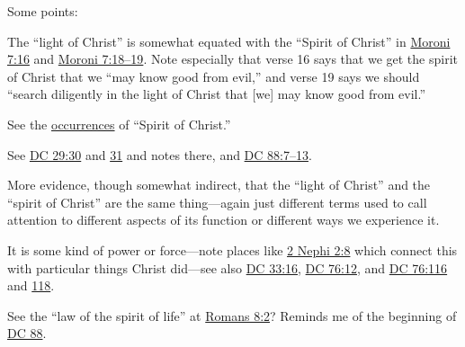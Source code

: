 		Some points:
		
			\begin{compactitem}
				\item The ``light of Christ'' is somewhat equated with the ``Spirit of Christ'' in \hyperref[MORONI-7-16]{Moroni 7:16} and \hyperref[MORONI-7-18]{Moroni 7:18--19}. Note especially that verse 16 says that we get the spirit of Christ that we ``may know good from evil,'' and verse 19 says we should ``search diligently in the light of Christ that [we] may know good from evil.''
					\begin{compactitem}
						\item See the \hyperref[SPIRIT-PHRASES]{occurrences} of ``Spirit of Christ.''
					\end{compactitem}
				\item See \hyperref[DC29-30]{DC 29:30} and \hyperref[DC29-31]{31} and notes there, and \hyperref[DC88-7]{DC 88:7--13}.
					\begin{compactitem}
						\item More evidence, though somewhat indirect, that the ``light of Christ'' and the ``spirit of Christ'' are the same thing---again just different terms used to call attention to different aspects of its function or different ways we experience it.
						\item It is some kind of power or force---note places like \hyperref[2NEPHI-2-8]{2 Nephi 2:8} which connect this with particular things Christ did---see also \hyperref[DC33-16]{DC 33:16}, \hyperref[DC76-12]{DC 76:12}, and \hyperref[DC76-116]{DC 76:116} and \hyperref[DC76-118]{118}.
					\end{compactitem}
				\item See the ``law of the spirit of life'' at \hyperref[ROMANS-8-2]{Romans 8:2}? Reminds me of the beginning of \hyperref[DC88]{DC 88}.
			\end{compactitem}